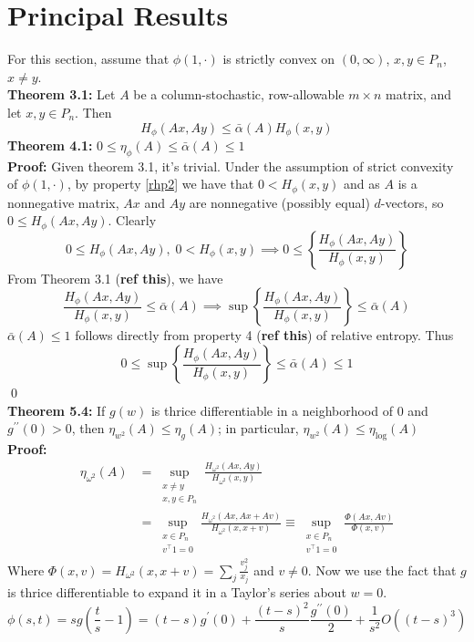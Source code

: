 \section{Principal Results}\label{results}
\noindent For this section, assume that $\phi(1, \cdot)$ is strictly convex on $(0, \infty)$, $x,y \in P_n$, $x \neq y$.\\
\noindent\textbf{Theorem 3.1:} Let $A$ be a column-stochastic, row-allowable $m \times n$ matrix, and let $x,y \in P_n$. Then \[H_\phi(Ax, Ay) \leq \bar{\alpha}(A)H_\phi(x,y)\]
\textbf{Theorem 4.1:} $0 \leq \eta_{\phi}(A) \leq \bar{\alpha}(A) \leq 1$ \\
\textbf{Proof:} Given theorem 3.1, it's trivial. Under the assumption of strict convexity of $\phi(1, \cdot)$, by property \ref{rhp2} we have that $0 < H_\phi(x, y)$ and as $A$ is a nonnegative matrix, $Ax$ and $Ay$ are nonnegative (possibly equal) $d$-vectors, so $0 \leq H_\phi(Ax, Ay)$. Clearly
    \[0 \leq H_\phi(Ax, Ay), \; 0<H_\phi(x,y) \implies 0\leq \left\{\frac{H_\phi(Ax, Ay)}{H_\phi(x,y)}\right\}\]
    From Theorem 3.1 (\textbf{ref this}), we have
    \[\frac{H_\phi(Ax, Ay) }{H_\phi(x,y)}\leq \bar{\alpha}(A) \implies \sup \left\{\frac{H_\phi(Ax, Ay)}{H_\phi(x,y)}\right\} \leq \bar{\alpha}(A)\]
$\bar{\alpha}(A) \leq 1$ follows directly from property 4 (\textbf{ref this}) of relative entropy. Thus 
\[ 0 \leq \sup \left\{\frac{H_\phi(Ax, Ay)}{H_\phi(x,y)}\right\} \leq \bar{\alpha}(A) \leq 1 \]
\qed \\
\textbf{Theorem 5.4:} If $g(w)$ is thrice differentiable in a neighborhood of $0$ and $g^{\prime\prime} (0) > 0$, then $\eta_{w^2}(A) \leq \eta_g(A)$; in particular, $\eta_{w^2}(A) \leq \eta_{\operatorname{log}}(A)$\\
\textbf{Proof:}
\begin{align}
    \eta_{\omega^2}(A) &= \sup_{\substack{x \neq y \\x,y \in P_n}} \frac{H_{\omega^2}(Ax, Ay)}{H_{\omega^2}(x,y)} \nonumber\\
    &= \sup_{\substack{x \in P_n \\ v^\top 1 = 0}} \frac{H_{\omega^2}(Ax, Ax + Av)}{H_{\omega^2}(x, x + v)} \equiv \sup_{\substack{x \in P_n \\ v^\top 1 = 0}}\frac{\Phi(Ax, Av)}{\Phi(x,v)} \label{helper_thm5.4}
\end{align}
Where $\Phi(x,v) = H_{\omega^2}(x, x + v) = \sum_j \frac{v_j^2}{x_j}$ and $v \neq 0$. Now we use the fact that $g$ is thrice differentiable to expand it in a Taylor's series about $w = 0$.
\[\phi(s,t) = sg\left(\frac{t}{s} - 1\right) = (t-s)g^\prime(0) + \frac{(t - s)^2}{s}\frac{g^{\prime\prime}(0)}{2} + \frac{1}{s^2}O\left((t - s)^3\right)\]
